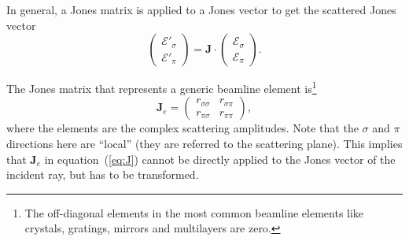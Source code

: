 \documentclass{iucr}
\begin{document}
In general, a Jones matrix is applied to a Jones vector to get the scattered Jones vector
\begin{equation}\label{eq:applyJones}
    \begin{pmatrix}
        \mathcal{E}'_\sigma \\
        \mathcal{E}'_\pi
    \end{pmatrix}
    =
    \textbf{J}
    \cdot
    \begin{pmatrix}
        \mathcal{E}_\sigma\\
        \mathcal{E}_\pi
    \end{pmatrix}.
\end{equation}

The Jones matrix that represents a generic beamline element is\footnote{The off-diagonal elements in the most common beamline elements like crystals, gratings, mirrors and multilayers are zero.}
\begin{equation}\label{eq:J}
\textbf{J}_e = 
\begin{pmatrix}
r_{\sigma\sigma} & r_{\sigma\pi}\\
r_{\pi\sigma} & r_{\pi\pi}
\end{pmatrix},
\end{equation}
where the elements are the complex scattering amplitudes.
Note that the $\sigma$ and $\pi$ directions here are ``local'' (they are referred to the scattering plane).
This implies that $\textbf{J}_e$ in equation~(\ref{eq:J}) cannot be directly applied to the Jones vector of the incident ray, but has to be transformed. 
\end{document}

